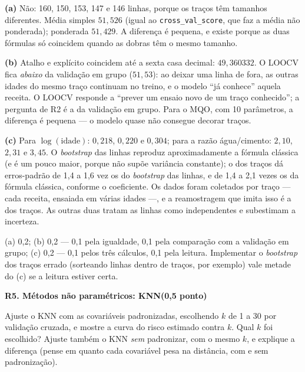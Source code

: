 \documentclass[11pt,a4paper]{article}
\newcommand{\tarefa}[3]{%
  \bigskip\par\noindent
  {\large\bfseries\color{azulufrj}#1. #2}\hfill{\bfseries(#3)}\par
  \nopagebreak\vspace{0.3em}}
\newcommand{\cod}[1]{\texttt{#1}}
\begin{document}
\begin{solucao}
\textbf{(a)} Não: 160, 150, 153, 147 e 146 linhas, porque os traços têm tamanhos
diferentes. Média simples $51{,}526$ (igual ao \cod{cross\_val\_score}, que faz a
média não ponderada); ponderada $51{,}429$. A diferença é pequena, e existe porque
as duas fórmulas só coincidem quando as dobras têm o mesmo tamanho.

\textbf{(b)} Atalho e explícito coincidem até a sexta casa decimal: $49{,}360332$. O
LOOCV fica
\emph{abaixo} da validação em grupo ($51{,}53$): ao deixar uma linha de fora, as outras
idades do mesmo traço continuam no treino, e o modelo ``já conhece'' aquela receita.
O LOOCV responde a ``prever um ensaio novo de um traço conhecido''; a pergunta de R2 é
a da validação em grupo. Para o MQO, com 10 parâmetros, a diferença é pequena --- o
modelo quase não consegue decorar traços.

\textbf{(c)} Para $\log(\text{idade})$: $0{,}218$, $0{,}220$ e $0{,}304$; para a
razão água/cimento: $2{,}10$, $2{,}31$ e $3{,}45$. O \emph{bootstrap} das linhas
reproduz aproximadamente a fórmula clássica (e é um pouco maior, porque não supõe
variância constante); o dos traços dá erros-padrão de 1,4 a 1,6 vez os do
\emph{bootstrap} das linhas, e de 1,4 a 2,1 vezes os da fórmula clássica, conforme o
coeficiente. Os dados foram coletados por traço --- cada receita, ensaiada
em várias idades ---, e a reamostragem que imita isso é a dos traços. As outras duas
tratam as linhas como independentes e subestimam a incerteza.
\end{solucao}

\begin{criterio}
(a) 0,2; (b) 0,2 --- 0,1 pela igualdade, 0,1 pela comparação com a validação em
grupo; (c) 0,2 --- 0,1 pelos três cálculos, 0,1 pela leitura. Implementar o
\emph{bootstrap} dos traços errado (sorteando linhas dentro de traços, por exemplo)
vale metade do (c) se a leitura estiver certa.
\end{criterio}

\tarefa{R5}{Métodos não paramétricos: KNN}{0,5 ponto}

\begin{itens}
  \item Ajuste o KNN com as covariáveis padronizadas, escolhendo $k$ de 1 a 30 por
        validação cruzada, e mostre a curva do risco estimado contra $k$. Qual $k$
        foi escolhido? Ajuste também o KNN \emph{sem} padronizar, com o mesmo $k$, e
        explique a diferença (pense em quanto cada covariável pesa na distância, com e
        sem padronização).
\end{itens}
\end{document}

